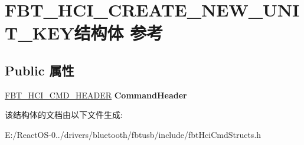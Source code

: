 \hypertarget{struct_f_b_t___h_c_i___c_r_e_a_t_e___n_e_w___u_n_i_t___k_e_y}{}\section{F\+B\+T\+\_\+\+H\+C\+I\+\_\+\+C\+R\+E\+A\+T\+E\+\_\+\+N\+E\+W\+\_\+\+U\+N\+I\+T\+\_\+\+K\+E\+Y结构体 参考}
\label{struct_f_b_t___h_c_i___c_r_e_a_t_e___n_e_w___u_n_i_t___k_e_y}
\subsection*{Public 属性}
\begin{DoxyCompactItemize}
\item 
\mbox{\label{struct_f_b_t___h_c_i___c_r_e_a_t_e___n_e_w___u_n_i_t___k_e_y_a5484a79eb1a66aa1fd0f41aa8a6dd666}} 
\hyperlink{struct_f_b_t___h_c_i___c_m_d___h_e_a_d_e_r}{F\+B\+T\+\_\+\+H\+C\+I\+\_\+\+C\+M\+D\+\_\+\+H\+E\+A\+D\+ER} {\bfseries Command\+Header}
\end{DoxyCompactItemize}


该结构体的文档由以下文件生成\+:\begin{DoxyCompactItemize}
\item 
E\+:/\+React\+O\+S-\/0../drivers/bluetooth/fbtusb/include/fbt\+Hci\+Cmd\+Structs.\+h\end{DoxyCompactItemize}
